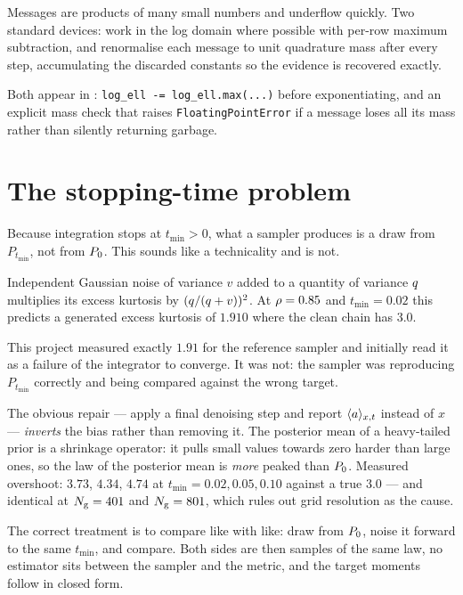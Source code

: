 Messages are products of many small numbers and underflow quickly. Two standard devices:
work in the log domain where possible with per-row maximum subtraction, and renormalise each
message to unit quadrature mass after every step, accumulating the discarded constants so the
evidence is recovered exactly.

\begin{codebox}
Both appear in : \texttt{log\_ell -= log\_ell.max(...)}
before exponentiating, and an explicit mass check that raises \texttt{FloatingPointError} if a
message loses all its mass rather than silently returning garbage.
\end{codebox}

\section{The stopping-time problem}
\label{sec:tmin}

Because integration stops at $t_{\min}>0$, what a sampler produces is a draw from
$P_{t_{\min}}$, not from $P_0$. This sounds like a technicality and is not.

Independent Gaussian noise of variance $v$ added to a quantity of variance $q$ multiplies
its excess kurtosis by $(q/(q+v))^2$. At $\rho=0.85$ and $t_{\min}=0.02$ this predicts
a generated excess kurtosis of $1.910$ where the clean chain has $3.0$.

\begin{pitfall}
This project measured exactly $1.91$ for the reference sampler and initially read it as a
failure of the integrator to converge. It was not: the sampler was reproducing
$P_{t_{\min}}$ correctly and being compared against the wrong target.

The obvious repair --- apply a final denoising step and report $\langle a \rangle_{x,t}$ instead of $x$ ---
\emph{inverts} the bias rather than removing it. The posterior mean of a heavy-tailed prior is
a shrinkage operator: it pulls small values towards zero harder than large ones, so the law of
the posterior mean is \emph{more} peaked than $P_0$. Measured overshoot: $3.73$, $4.34$, $4.74$
at $t_{\min}=0.02,0.05,0.10$ against a true $3.0$ --- and identical at $N_{\mathrm{g}}=401$ and
$N_{\mathrm{g}}=801$, which rules out grid resolution as the cause.

The correct treatment is to compare like with like: draw from $P_0$, noise it forward to the
same $t_{\min}$, and compare. Both sides are then samples of the same law, no estimator sits
between the sampler and the metric, and the target moments follow in closed form.
\end{pitfall}

